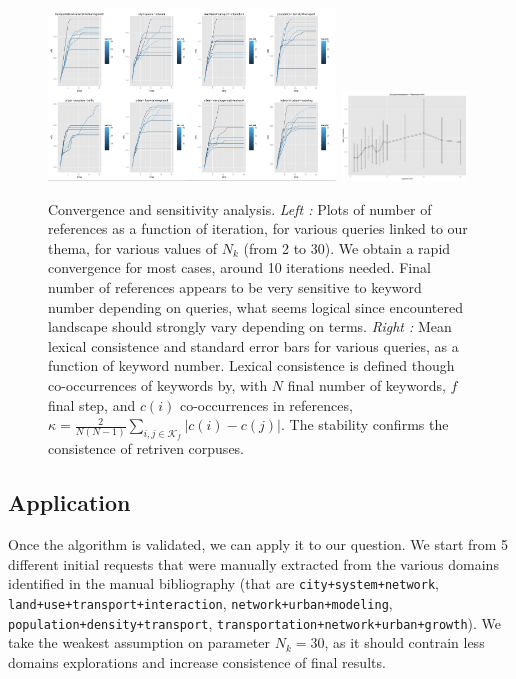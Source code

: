 \begin{figure}
\includegraphics[width=0.68\textwidth]{figures/explo.png}
\includegraphics[width=0.3\textwidth,height=0.3\textheight]{figures/lexicalConsistence_MeanSd}
\caption{Convergence and sensitivity analysis.
\textit{Left : } Plots of number of references as a function of iteration, for various queries linked to our thema, for various values of $N_k$ (from 2 to 30). We obtain a rapid convergence for most cases, around 10 iterations needed. Final number of references appears to be very sensitive to keyword number depending on queries, what seems logical since encountered landscape should strongly vary depending on terms. \textit{Right : } Mean lexical consistence and standard error bars for various queries, as a function of keyword number. Lexical consistence is defined though co-occurrences of keywords by, with $N$ final number of keywords, $f$ final step, and $c(i)$ co-occurrences in references, $\kappa = \frac{2}{N(N-1)}\sum_{i,j \in \mathcal{K}_f}{|c(i)-c(j)|}$. The stability confirms the consistence of retriven corpuses.}
\end{figure}



\subsection{Application}

Once the algorithm is validated, we can apply it to our question. We start from 5 different initial requests that were manually extracted from the various domains identified in the manual bibliography (that are \texttt{city+system+network}, \texttt{land+use+transport+interaction}, \texttt{network+urban+modeling}, \texttt{population+density+transport}, \texttt{transportation+network+urban+growth}). We take the weakest assumption on parameter $N_k=30$, as it should contrain less domains explorations and increase consistence of final results.

